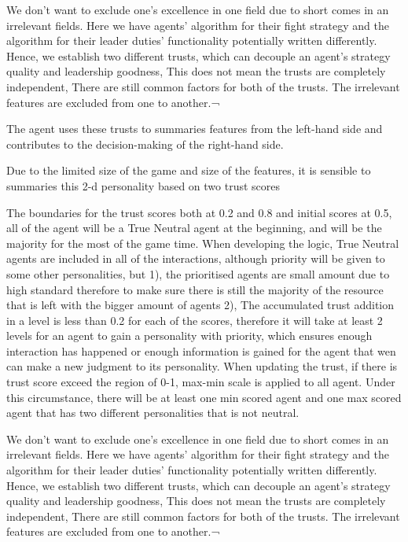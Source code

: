 We don’t want to exclude one’s excellence in one field due to short comes in an irrelevant fields.
Here we have agents’ algorithm for their fight strategy and the algorithm for their leader duties’ functionality potentially written differently. 
Hence, we establish two different trusts, which can decouple an agent’s strategy quality and leadership goodness, 
This does not mean the trusts are completely independent, 
There are still common factors for both of the trusts.
The irrelevant features are excluded from one to another.¬

The agent uses these trusts to summaries features from the left-hand side and contributes to the decision-making of the right-hand side. 

Due to the limited size of the game and size of the features, it is sensible to summaries this 2-d personality based on two trust scores

The boundaries for the trust scores both at 0.2 and 0.8 and initial scores at 0.5, all of the agent will be a True Neutral agent at the beginning, and will be the majority for the most of the game time. When developing the logic, True Neutral agents are included in all of the interactions, although priority will be given to some other personalities, but 1), the prioritised agents are small amount due to high standard therefore to make sure there is still the majority of the resource that is left with the bigger amount of agents 2), The accumulated trust addition in a level is less than 0.2 for each of the scores, therefore it will take at least 2 levels for an agent to gain a personality with priority, which ensures enough interaction has happened or enough information is gained for the agent that wen can make a new judgment to its personality. When updating the trust, if there is trust score exceed the region of 0-1, max-min scale is applied to all agent. Under this circumstance, there will be at least one min scored agent and one max scored agent that has two different personalities that is not neutral. 

We don’t want to exclude one’s excellence in one field due to short comes in an irrelevant fields.
Here we have agents’ algorithm for their fight strategy and the algorithm for their leader duties’ functionality potentially written differently. 
Hence, we establish two different trusts, which can decouple an agent’s strategy quality and leadership goodness, 
This does not mean the trusts are completely independent, 
There are still common factors for both of the trusts.
The irrelevant features are excluded from one to another.¬

